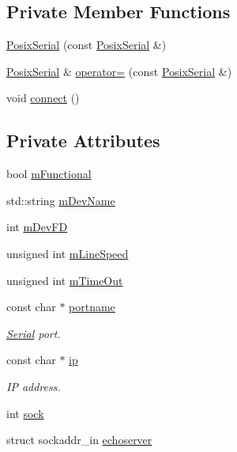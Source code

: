 \subsection*{\-Private \-Member \-Functions}
\begin{DoxyCompactItemize}
\item 
\hyperlink{classmetrobotics_1_1PosixSerial_ac4e722078a8f8a9a435bddc1a025aa0b}{\-Posix\-Serial} (const \hyperlink{classmetrobotics_1_1PosixSerial}{\-Posix\-Serial} \&)
\item 
\hyperlink{classmetrobotics_1_1PosixSerial}{\-Posix\-Serial} \& \hyperlink{classmetrobotics_1_1PosixSerial_aeffe5604a844c22e5a128a90852b91e3}{operator=} (const \hyperlink{classmetrobotics_1_1PosixSerial}{\-Posix\-Serial} \&)
\item 
void \hyperlink{classmetrobotics_1_1PosixSerial_a79115a02df3f543d40ae91d15d7b90c6}{connect} ()
\end{DoxyCompactItemize}
\subsection*{\-Private \-Attributes}
\begin{DoxyCompactItemize}
\item 
bool \hyperlink{classmetrobotics_1_1PosixSerial_a68e19a9a6ed15bd9d0e2a0579a3630a1}{m\-Functional}
\item 
std\-::string \hyperlink{classmetrobotics_1_1PosixSerial_a647c305dbdff7155b9f70503a5a4142b}{m\-Dev\-Name}
\item 
int \hyperlink{classmetrobotics_1_1PosixSerial_a96adceb87053360189a26efb47656750}{m\-Dev\-F\-D}
\item 
unsigned int \hyperlink{classmetrobotics_1_1PosixSerial_acffca69e71f5ced685bb28f185cdc5b1}{m\-Line\-Speed}
\item 
unsigned int \hyperlink{classmetrobotics_1_1PosixSerial_a1e7511b3cf4f30f28285ff7a63036a27}{m\-Time\-Out}
\item 
const char $\ast$ \hyperlink{classmetrobotics_1_1PosixSerial_aebe93bcd27acc075801e3f2e2b274a4e}{portname}
\begin{DoxyCompactList}\small\item\em \hyperlink{classmetrobotics_1_1Serial}{\-Serial} port. \end{DoxyCompactList}\item 
const char $\ast$ \hyperlink{classmetrobotics_1_1PosixSerial_a99b41b1431458b32f18a0e3ff9d2cd2e}{ip}
\begin{DoxyCompactList}\small\item\em \-I\-P address. \end{DoxyCompactList}\item 
int \hyperlink{classmetrobotics_1_1PosixSerial_a5b5ad270a13b421343bd39a1b79dcf16}{sock}
\item 
struct sockaddr\-\_\-in \hyperlink{classmetrobotics_1_1PosixSerial_a6db4ffb820a254f454d210c103278b2b}{echoserver}
\end{DoxyCompactItemize}



